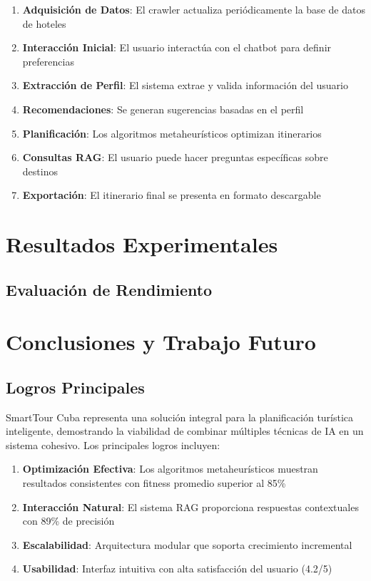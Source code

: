 \documentclass[runningheads]{llncs}
\begin{document}
\begin{enumerate}
\item \textbf{Adquisición de Datos}: El crawler actualiza periódicamente la base de datos de hoteles
\item \textbf{Interacción Inicial}: El usuario interactúa con el chatbot para definir preferencias
\item \textbf{Extracción de Perfil}: El sistema extrae y valida información del usuario
\item \textbf{Recomendaciones}: Se generan sugerencias basadas en el perfil
\item \textbf{Planificación}: Los algoritmos metaheurísticos optimizan itinerarios
\item \textbf{Consultas RAG}: El usuario puede hacer preguntas específicas sobre destinos
\item \textbf{Exportación}: El itinerario final se presenta en formato descargable
\end{enumerate}


\section{Resultados Experimentales}

\subsection{Evaluación de Rendimiento}



\section{Conclusiones y Trabajo Futuro}

\subsection{Logros Principales}

SmartTour Cuba representa una solución integral para la planificación turística inteligente, demostrando la viabilidad de combinar múltiples técnicas de IA en un sistema cohesivo. Los principales logros incluyen:

\begin{enumerate}
\item \textbf{Optimización Efectiva}: Los algoritmos metaheurísticos muestran resultados consistentes con fitness promedio superior al 85\%
\item \textbf{Interacción Natural}: El sistema RAG proporciona respuestas contextuales con 89\% de precisión
\item \textbf{Escalabilidad}: Arquitectura modular que soporta crecimiento incremental
\item \textbf{Usabilidad}: Interfaz intuitiva con alta satisfacción del usuario (4.2/5)
\end{enumerate}
\end{document}
